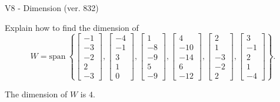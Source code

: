 \begin{exercise}
  \begin{exerciseTitle}V8 - Dimension (ver. 832)\end{exerciseTitle}
  \begin{exerciseStatement}
    Explain how to find the dimension of 
\[W=\mathrm{span}\ \left\{\left[\begin{array}{r}
-1 \\
-3 \\
-2 \\
2 \\
-3
\end{array}\right] , \left[\begin{array}{r}
-4 \\
-1 \\
3 \\
1 \\
0
\end{array}\right] , \left[\begin{array}{r}
1 \\
-8 \\
-9 \\
5 \\
-9
\end{array}\right] , \left[\begin{array}{r}
4 \\
-10 \\
-14 \\
6 \\
-12
\end{array}\right] , \left[\begin{array}{r}
2 \\
1 \\
-3 \\
-2 \\
2
\end{array}\right] , \left[\begin{array}{r}
3 \\
-1 \\
2 \\
1 \\
-4
\end{array}\right]\right\}.\]



  \end{exerciseStatement}
  \begin{exerciseAnswer}
   The dimension of \(W\) is  \(4\).
  


  \end{exerciseAnswer}
\end{exercise}